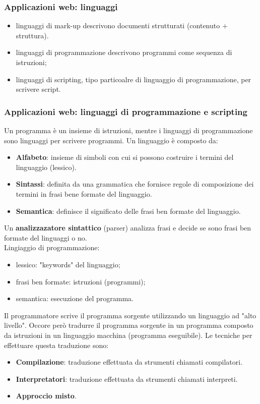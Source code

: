 \documentclass{article}
\begin{document}
\subsubsection{Applicazioni web: linguaggi}
\begin{itemize}
    \item linguaggi di mark-up descrivono documenti strutturati (contenuto + struttura).
    \item linguaggi di programmazione descrivono programmi come sequenza di istruzioni;
    \item linguaggi di scripting, tipo particoalre di linguaggio di programmazione, per scrivere script.
\end{itemize}

\subsubsection{Applicazioni web: linguaggi di programmazione e scripting}
Un programma è un insieme di istruzioni, mentre i linguaggi di programmazione sono linguaggi per scrivere programmi. Un linguaggio è composto da:
\begin{itemize}
    \item \textbf{Alfabeto}: insieme di simboli con cui si possono costruire i termini del linguaggio (lessico).
    \item \textbf{Sintassi}: definita da una grammatica che fornisce regole di composizione dei termini in frasi bene formate del linguaggio.
    \item \textbf{Semantica}: definisce il significato delle frasi ben formate del linguaggio.
\end{itemize}
Un \textbf{analizzazatore sintattico} (parser) analizza frasi e decide se sono frasi ben formate del linguaggi o no.
\\ Lingiaggio di programmazione:
\begin{itemize}
    \item lessico: "keywords" del linguaggio;
    \item frasi ben formate: istruzioni (programmi);
    \item semantica: esecuzione del programma.
\end{itemize}
Il programmatore scrive il programma sorgente utilizzando un linguaggio ad "alto livello". Occore però tradurre il programma sorgente in un programma composto da istruzioni
in un linguaggio macchina (programma eseguibile). Le tecniche per effettuare questa traduzione sono:
\begin{itemize}
    \item \textbf{Compilazione}: traduzione effettuata da strumenti chiamati compilatori.
    \item \textbf{Interpretatori}: traduzione effettuata da strumenti chiamati interpreti.
    \item \textbf{Approccio misto}.
\end{itemize}
\end{document}
